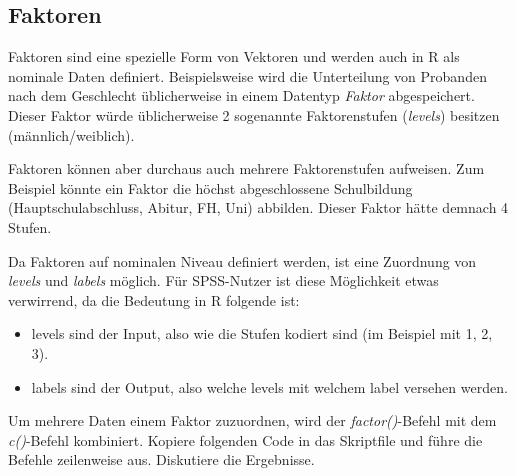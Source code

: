 \documentclass[]{article}
\providecommand{\tightlist}{%
  \setlength{\itemsep}{0pt}\setlength{\parskip}{0pt}}
\begin{document}
\subsection*{Faktoren}\label{faktoren}

Faktoren sind eine spezielle Form von Vektoren und werden auch in R als
nominale Daten definiert. Beispielsweise wird die Unterteilung von
Probanden nach dem Geschlecht üblicherweise in einem Datentyp
\emph{Faktor} abgespeichert. Dieser Faktor würde üblicherweise 2
sogenannte Faktorenstufen (\emph{levels}) besitzen (männlich/weiblich).

Faktoren können aber durchaus auch mehrere Faktorenstufen aufweisen. Zum
Beispiel könnte ein Faktor die höchst abgeschlossene Schulbildung
(Hauptschulabschluss, Abitur, FH, Uni) abbilden. Dieser Faktor hätte
demnach 4 Stufen.

Da Faktoren auf nominalen Niveau definiert werden, ist eine Zuordnung
von \emph{levels} und \emph{labels} möglich. Für SPSS-Nutzer ist diese
Möglichkeit etwas verwirrend, da die Bedeutung in R folgende ist:

\begin{itemize}
\tightlist
\item
  levels sind der Input, also wie die Stufen kodiert sind (im Beispiel
  mit 1, 2, 3).
\item
  labels sind der Output, also welche levels mit welchem label versehen
  werden.
\end{itemize}

Um mehrere Daten einem Faktor zuzuordnen, wird der
\emph{factor()}-Befehl mit dem \emph{c()}-Befehl kombiniert. Kopiere
folgenden Code in das Skriptfile und führe die Befehle zeilenweise aus.
Diskutiere die Ergebnisse.
\end{document}
